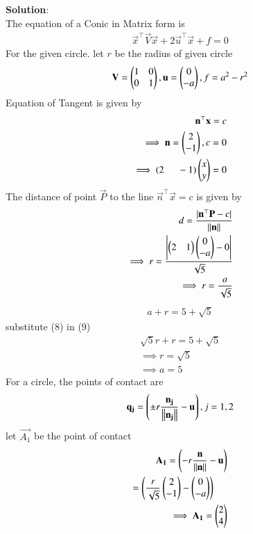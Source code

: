 \documentclass[journal]{IEEEtran}
\begin{document}
\textbf{Solution}:\\
The equation of a Conic in Matrix form is
\begin{align}
\vec{x}^\top\vec{V}\vec{x} + 2\vec{u}^\top\vec{x} + f = 0
\end{align}
For the given circle. let $r$ be the radius of given circle 
\begin{align}
    \mathbf{V}=\begin{pmatrix}
        1 & 0\\
        0 & 1
    \end{pmatrix},\mathbf{u}=\begin{pmatrix}0\\-a\end{pmatrix},f=a^2-r^2
\end{align}
Equation of Tangent is given by
\begin{align}
    \mathbf{n}^\top\mathbf{x}=c\\
    \implies \mathbf{n}=\begin{pmatrix}2\\-1\end{pmatrix} ,c=0\\
    \implies \left(2\hspace{0.5cm}-1\right)\begin{pmatrix}x\\y\end{pmatrix}=0
\end{align}
The distance of point $\vec{P}$ to the line $\vec{n}^\top\vec{x}=c$ is given by
\begin{align}
    d=\frac{|\mathbf{n}^\top\mathbf{P}-c|}{\left\lVert\mathbf{n}\right\rVert}\\
    \implies r = \frac{\left\lvert
\begin{pmatrix} 2 & 1 \end{pmatrix}
\begin{pmatrix} 0 \\ -a \end{pmatrix} - 0
\right\rvert}{\sqrt{5}}\\
\implies r=\frac{a}{\sqrt{5}}
\end{align}
\begin{align}
a + r = 5 + \sqrt{5}
\end{align}
substitute (8) in (9)
\begin{align}
\sqrt{5}r +r =5 +\sqrt{5}\\
    \implies r=\sqrt{5}\\
    \implies a=5
\end{align}
For a circle, the points of contact are
\begin{align}
    \mathbf{q_{j}}=\left(\pm r \frac{\mathbf{n_j}}{\left\lVert\mathbf{n_j}\right\rVert}-\mathbf{u}\right),j=1,2
\end{align}
let $\vec{A_1}$ be the point of contact
\begin{align}
    \mathbf{A_1}=\left(-r \frac{\mathbf{n}}{\left\lVert\mathbf{n}\right\rVert}-\mathbf{u}\right)\\
    =\left(\frac{r}{\sqrt{5}}\begin{pmatrix}2\\-1\end{pmatrix}-\begin{pmatrix}0\\-a\end{pmatrix}\right) \hspace{0.5cm}\\ 
    \implies \mathbf{A_1}=\begin{pmatrix}2\\4\end{pmatrix}
\end{align}
\end{document}
